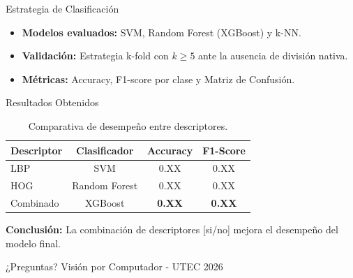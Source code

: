 \documentclass[10pt]{beamer}
\begin{document}
\begin{frame}{Estrategia de Clasificación}
    \begin{itemize}
        \item \textbf{Modelos evaluados:} SVM, Random Forest (XGBoost) y k-NN.
        \item \textbf{Validación:} Estrategia k-fold con $k \ge 5$ ante la ausencia de división nativa.
        \item \textbf{Métricas:} Accuracy, F1-score por clase y Matriz de Confusión.
    \end{itemize}
\end{frame}

\begin{frame}{Resultados Obtenidos}
    \begin{table}[]
        \centering
        \begin{tabular}{lccc}
            \toprule
            Descriptor & Clasificador & Accuracy & F1-Score \\
            \midrule
            LBP        & SVM          & 0.XX     & 0.XX     \\
            HOG        & Random Forest& 0.XX     & 0.XX     \\
            Combinado  & XGBoost      & \textbf{0.XX} & \textbf{0.XX} \\
            \bottomrule
        \end{tabular}
        \caption{Comparativa de desempeño entre descriptores.}
    \end{table}
    \textbf{Conclusión:} La combinación de descriptores [si/no] mejora el desempeño del modelo final.
\end{frame}

\begin{frame}
    \centering
    \Huge ¿Preguntas?
    \vfill
    \small Visión por Computador - UTEC 2026
\end{frame}
\end{document}
